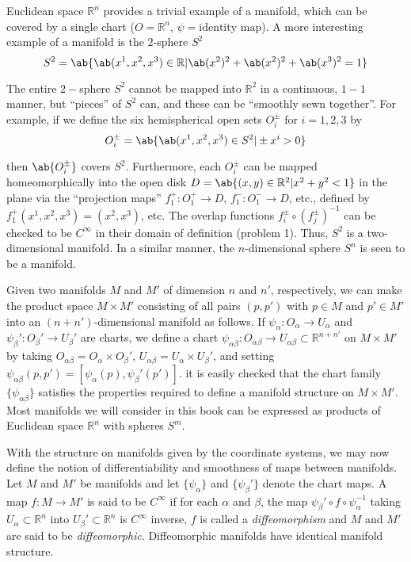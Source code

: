 Euclidean space $\mathbb{R}^n$ provides a trivial example of a manifold, which can be covered by a single chart ($O=\mathbb{R}^n$, $\psi=\text{identity map}$). A more interesting example of a manifold is the $2$-sphere $S^2$
 \[S^2=\ab\{\ab(x^1,x^2,x^3)\in\mathbb{R}|\ab(x^2)^2+\ab(x^2)^2+\ab(x^3)^2=1\}\]

The entire $2-$sphere $S^2$ cannot be mapped into $\mathbb{R}^2$ in a continuous, $1-1$ manner, but ``pieces'' of $S^2$ can, and these can be ``smoothly sewn together''. For example, if we define the six hemispherical open sets $O_i^\pm$ for $i=1,2,3$ by
\[
    O_i^\pm=\ab\{\ab(x^1,x^2,x^3)\in S^2|\pm x^i>0\}
\]

then $\ab\{O_i^\pm\}$ covers $S^2$. Furthermore, each $O_i^\pm$ can be mapped homeomorphically into the open disk $D=\ab\{(x,y)\in\mathbb{R}^2|x^2+y^2<1\}$ in the plane via the ``projection maps'' $f_1^+:O_1^+\to D$, $f_1^-:O_1^-\to D$, etc., defined by $f_1^+(x^1,x^2,x^3)=(x^2,x^3)$, etc. The overlap functions $f_i^\pm\circ(f_j^\pm)^{-1}$ can be checked to be $C^\infty$ in their domain of definition (problem 1). Thus, $S^2$ is a two-dimensional manifold. In a similar manner, the $n$-dimensional sphere $S^n$ is seen to be a manifold.

Given two manifolds $M$ and $M'$ of dimension $n$ and $n'$, respectively, we can make the product space $M\times M'$ consisting of all pairs $(p,p')$ with $p\in M$ and $p'\in M'$ into an $(n+n')$-dimensional manifold as follows. If $\psi_\alpha:O_\alpha\to U_\alpha$ and $\psi_\beta':O_\beta'\to U_\beta'$ are charts, we define a chart $\psi_{\alpha\beta}:O_{\alpha\beta}\to U_{\alpha\beta}\subset\mathbb{R}^{n+n'}$ on $M\times M'$ by taking $O_{\alpha\beta}=O_\alpha\times O_\beta'$, $U_{\alpha\beta}=U_\alpha\times U_\beta'$, and setting $\psi_{\alpha\beta}(p,p')=[\psi_\alpha(p),\psi_\beta'(p')]$. it is easily checked that the chart family $\{\psi_{\alpha\beta}\}$ satisfies the properties required to define a manifold structure on $M\times M'$. Most manifolds we will consider in this book can be expressed as products of Euclidean space $\mathbb{R}^n$ with spheres $S^m$.

With the structure on manifolds given by the coordinate systems, we may now define the notion of differentiability and smoothness of maps between manifolds. Let $M$ and $M'$ be manifolds and let $\{\psi_\alpha\}$ and $\{\psi_\beta'\}$ denote the chart maps. A map $f:M\to M'$ is said to be $C^\infty$ if for each $\alpha$ and $\beta$, the map $\psi_\beta'\circ f\circ\psi_\alpha^{-1}$ taking $U_\alpha\subset\mathbb{R}^n$ into $U_\beta'\subset\mathbb{R}^n$ is $C^\infty$ inverse, $f$ is called a \emph{diffeomorphism} and $M$ and $M'$ are said to be \emph{diffeomorphic}. Diffeomorphic manifolds have identical manifold structure.

